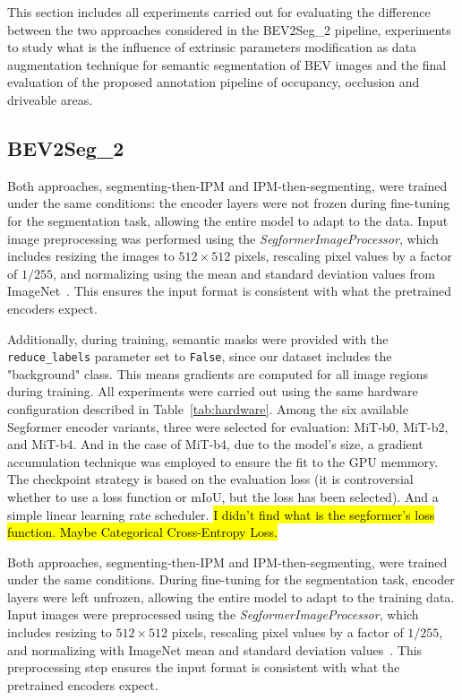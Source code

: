 
This section includes all experiments carried out for evaluating the difference between the two approaches considered in the BEV2Seg\_2 pipeline, experiments to study what is the influence of extrinsic parameters modification as data augmentation technique for semantic segmentation of BEV images and the final evaluation of the proposed annotation pipeline of occupancy, occlusion and driveable areas.

\subsection{BEV2Seg\_2}
Both approaches, segmenting-then-IPM and IPM-then-segmenting, were trained under the same conditions: the encoder layers were not frozen during fine-tuning for the segmentation task, allowing the entire model to adapt to the data. Input image preprocessing was performed using the \textit{SegformerImageProcessor}, which includes resizing the images to $512 \times 512$ pixels, rescaling pixel values by a factor of $1/255$, and normalizing using the mean and standard deviation values from ImageNet~\cite{imagenet}. This ensures the input format is consistent with what the pretrained encoders expect.

Additionally, during training, semantic masks were provided with the \texttt{reduce\_labels} parameter set to \texttt{False}, since our dataset includes the "background" class. This means gradients are computed for all image regions during training. All experiments were carried out using the same hardware configuration described in Table~\ref{tab:hardware}. Among the six available Segformer encoder variants, three were selected for evaluation: MiT-b0, MiT-b2, and MiT-b4. And in the case of MiT-b4, due to the model's size, a gradient accumulation technique was employed to ensure the fit to the GPU memmory. The checkpoint strategy is based on the evaluation loss (it is controversial whether to use a loss function or mIoU, but the loss has been selected). And a simple linear learning rate scheduler.
\hl{I didn't find what is the segformer's loss function. Maybe Categorical Cross-Entropy Loss.} 

Both approaches, segmenting-then-IPM and IPM-then-segmenting, were trained under the same conditions. During fine-tuning for the segmentation task, encoder layers were left unfrozen, allowing the entire model to adapt to the training data. Input images were preprocessed using the \textit{SegformerImageProcessor}, which includes resizing to $512 \times 512$ pixels, rescaling pixel values by a factor of $1/255$, and normalizing with ImageNet mean and standard deviation values~\cite{imagenet}. This preprocessing step ensures the input format is consistent with what the pretrained encoders expect.

